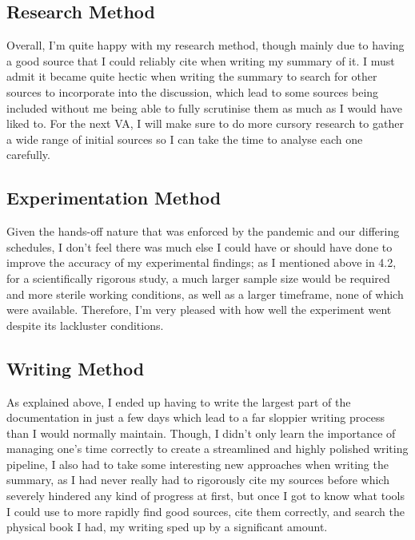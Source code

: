 \documentclass[a4paper,10pt]{article}
\begin{document}
\subsection{Research Method}
Overall, I'm quite happy with my research method, though mainly due to having a good source that I could
reliably cite when writing my summary of it.
I must admit it became quite hectic when writing the summary to search for other sources to incorporate
into the discussion, which lead to some sources being included without me being able to fully scrutinise
them as much as I would have liked to. For the next VA, I will make sure to do more cursory research to
gather a wide range of initial sources so I can take the time to analyse each one carefully.

\subsection{Experimentation Method}
Given the hands-off nature that was enforced by the pandemic and our differing schedules, I don't feel
there was much else I could have or should have done to improve the accuracy of my experimental findings;
as I mentioned above in 4.2, for a scientifically rigorous study, a much larger sample size would be
required and more sterile working conditions, as well as a larger timeframe, none of which were available.
Therefore, I'm very pleased with how well the experiment went despite its lackluster conditions.

\subsection{Writing Method}
As explained above, I ended up having to write the largest part of the documentation in just a few days
which lead to a far sloppier writing process than I would normally maintain. Though, I didn't only learn
the importance of managing one's time correctly to create a streamlined and highly polished writing
pipeline, I also had to take some interesting new approaches when writing the summary, as I had never
really had to rigorously cite my sources before which severely hindered any kind of progress at first,
but once I got to know what tools I could use to more rapidly find good sources, cite them correctly,
and search the physical book I had, my writing sped up by a significant amount.
\end{document}
